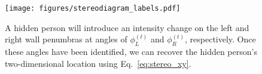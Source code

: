 \begin{figure}[tb]
\centering
\texttt{[image: figures/stereodiagram\_labels.pdf]}
\vspace{-0.3in}
\caption{
A hidden person will introduce an intensity change on the left and right wall penumbras at angles of $\phi^{(t)}_L$ and $\phi^{(t)}_R$, respectively. 
Once these angles have been identified, we can recover the hidden person's two-dimensional location using Eq.~\ref{eq:stereo_xy}. \label{fig:stereodiagram2} }
\vspace{-.2in}
\end{figure}














